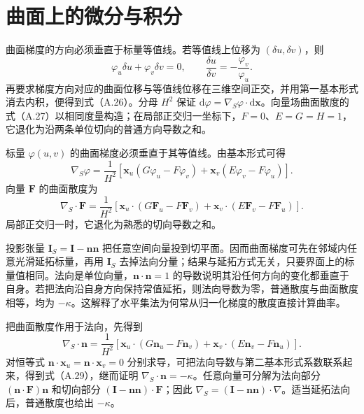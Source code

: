 \documentclass[11pt,a4paper,openany,fontset=none]{ctexbook}
\begin{document}
\section{曲面上的微分与积分}
曲面梯度的方向必须垂直于标量等值线。若等值线上位移为 $(\delta u,\delta v)$，则
\begin{equation}
 \varphi_u\delta u+\varphi_v\delta v=0,
 \qquad \frac{\delta u}{\delta v}=-\frac{\varphi_v}{\varphi_u}. \tag{A.25}
\end{equation}
再要求梯度方向对应的曲面位移与等值线位移在三维空间正交，并用第一基本形式消去内积，便得到式（A.26）。分母 $H^2$ 保证 $\mathrm d\varphi=\nabla_S\varphi\cdot\mathrm d\bm x$。向量场曲面散度的式（A.27）以相同度量构造；在局部正交归一坐标下，$F=0$、$E=G=H=1$，它退化为沿两条单位切向的普通方向导数之和。


标量 $\varphi(u,v)$ 的曲面梯度必须垂直于其等值线。由基本形式可得
\begin{equation}
 \nabla_S\varphi=\frac1{H^2}\left[
 \bm x_u(G\varphi_u-F\varphi_v)+\bm x_v(E\varphi_v-F\varphi_u)
 \right]. \tag{A.26}
\end{equation}
向量 $\bm F$ 的曲面散度为
\begin{equation}
 \nabla_S\cdot\bm F=\frac1{H^2}\left[
 \bm x_u\cdot(G\bm F_u-F\bm F_v)+
 \bm x_v\cdot(E\bm F_v-F\bm F_u)\right]. \tag{A.27}
\end{equation}
局部正交归一时，它退化为熟悉的切向导数之和。

投影张量 $\bm I_S=\bm I-\bm n\bm n$ 把任意空间向量投到切平面。因而曲面梯度可先在邻域内任意光滑延拓标量，再用 $\bm I_S$ 去掉法向分量；结果与延拓方式无关，只要界面上的标量值相同。法向是单位向量，$\bm n\cdot\bm n=1$ 的导数说明其沿任何方向的变化都垂直于自身。若把法向沿自身方向保持常值延拓，则法向导数为零，普通散度与曲面散度相等，均为 $-\kappa$。这解释了水平集法为何常从归一化梯度的散度直接计算曲率。

把曲面散度作用于法向，先得到
\begin{equation}
 \nabla_S\cdot\bm n=\frac{1}{H^2}\!\left[
 \bm x_u\cdot(G\bm n_u-F\bm n_v)+
 \bm x_v\cdot(E\bm n_v-F\bm n_u)\right]. \tag{A.28}
\end{equation}
对恒等式 $\bm n\cdot\bm x_u=\bm n\cdot\bm x_v=0$ 分别求导，可把法向导数与第二基本形式系数联系起来，得到式（A.29），继而证明 $\nabla_S\cdot\bm n=-\kappa$。任意向量可分解为法向部分 $(\bm n\cdot\bm F)\bm n$ 和切向部分 $(\bm I-\bm n\bm n)\cdot\bm F$；因此 $\nabla_S=(\bm I-\bm n\bm n)\cdot\nabla$。适当延拓法向后，普通散度也给出 $-\kappa$。
\end{document}
